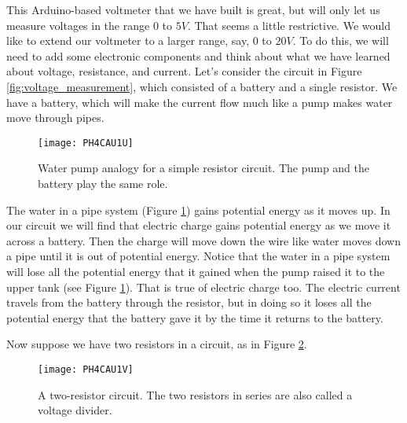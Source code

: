 This Arduino-based voltmeter that we have built is great, but will only let
us measure voltages in the range $0$ to $5\unit{V}.$ That seems a little
restrictive. We would like to extend our voltmeter to a larger range, say, $%
0 $ to $20\unit{V}.$ To do this, we will need to add some electronic
components and think about what we have learned about voltage, resistance,
and current. Let's consider the circuit in Figure \ref{fig:voltage_measurement},
which consisted of a battery and a single resistor.
We have a battery, which will make
the current flow much like a pump makes water move through pipes.

\begin{figure}[htbp!]
\centering
\texttt{[image: PH4CAU1U]}
	\caption[Water pump analogy for a simple resistor circuit]{Water pump
	analogy for a simple resistor circuit. The pump and the battery play 
	the same role.}
	\label{fig:water_pump_analogy_1}
\end{figure}

The water in a pipe system (Figure \ref{fig:water_pump_analogy_1}) gains
potential energy as it moves up. In our circuit we will find that electric
charge gains potential energy as we move it across a battery. Then the
charge will move down the wire like water moves down a pipe until it is out
of potential energy. Notice that the water in a pipe system will lose all
the potential energy that it gained when the pump raised it to the upper
tank (see Figure \ref{fig:water_pump_analogy_1}). 
That is true of electric charge too. The
electric current travels from the battery through the resistor, but in doing
so it loses all the potential energy that the battery gave it by the time it
returns to the battery.

Now suppose we have two resistors in a circuit, as in Figure
\ref{fig:voltage_divider}. 

\begin{figure}[htbp!]
\centering
\texttt{[image: PH4CAU1V]}
\caption[A two-resistor circuit]{A two-resistor circuit. The two 
resistors in series are also called a voltage divider.}
\label{fig:voltage_divider}
\end{figure}

